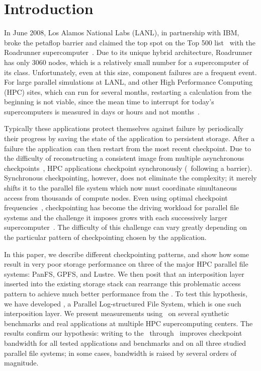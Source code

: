 \section{Introduction}



In June 2008, Los Alamos National Labs (LANL), in partnership with IBM, broke
the petaflop barrier and claimed the top spot on the Top 500 list~\cite{top500}
with the Roadrunner supercomputer~\cite{roadrunner}.  Due to its unique hybrid
architecture, Roadrunner has only 3060 nodes, which is a relatively small
number for a supercomputer of its class.  Unfortunately, even at this size,
component failures are a frequent event.  For large parallel simulations at
LANL, and other High Performance Computing (HPC) sites, which can run for
several months, restarting a calculation from the beginning is not viable,
since the mean time to interrupt for today's supercomputers is measured in days
or hours and not months~\cite{google-failure,schroeder-failure}.  



Typically these applications protect themselves against failure by periodically
 their progress by saving the state of the application to
persistent storage. After a failure the application can then restart from the most recent 
checkpoint.  Due to the difficulty of reconstructing a consistent
image from multiple asynchronous checkpoints~\cite{lamport1978}, HPC
applications checkpoint synchronously (\ie\ following a barrier).  Synchronous
checkpointing, however, does not eliminate the complexity; it merely shifts it to
the parallel file system which now must coordinate simultaneous access from
thousands of compute nodes.  Even using optimal checkpoint frequencies~\cite{daly-optimal}, 
checkpointing has become the driving workload for
parallel file systems and the challenge it imposes grows with each successively
larger supercomputer~\cite{pcl:99:me,schroeder2007}.  The difficulty of this
challenge can vary greatly depending on the particular pattern of checkpointing
chosen by the application. 

In this paper, we describe different checkpointing patterns, and show how some
result in very poor storage performance on three of the major HPC
parallel file systems: PanFS, GPFS, and Lustre.  We then posit that an
interposition layer inserted into the existing storage stack can rearrange this
problematic access pattern to achieve much better performance from the
\upfs.  To test this hypothesis, we have developed \plfs, a Parallel
Log-structured File System, which is one such interposition layer.  We present measurements using \plfs\ on several synthetic benchmarks and real applications at multiple HPC supercomputing centers.  The
results confirm our hypothesis: writing to the \upfs\ through
\plfs\ improves checkpoint bandwidth for all tested applications and
benchmarks and on all three studied parallel file systems; in some cases,
bandwidth is raised by several orders of magnitude.

